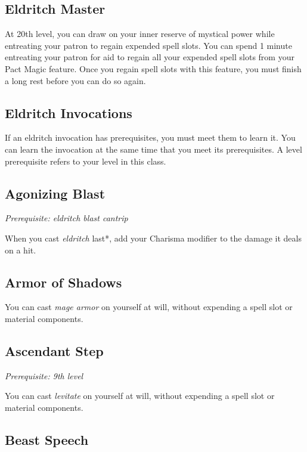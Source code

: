 \subsection{Eldritch Master}

At 20th level, you can draw on your inner reserve of mystical power while entreating your patron to regain expended spell slots. You can spend 1 minute entreating your patron for aid to regain all your expended spell slots from your Pact Magic feature. Once you regain spell slots with this feature, you must finish a long rest before you can do so again.

\subsection{Eldritch Invocations}

If an eldritch invocation has prerequisites, you must meet them to learn it. You can learn the invocation at the same time that you meet its prerequisites. A level prerequisite refers to your level in this class.

\subsection{Agonizing Blast}

\textit{Prerequisite: eldritch blast cantrip}

When you cast \textit{eldritch }last*, add your Charisma modifier to the damage it deals on a hit.

\subsection{Armor of Shadows}

You can cast \textit{mage armor} on yourself at will, without expending a spell slot or material components.

\subsection{Ascendant Step}

\textit{Prerequisite: 9th level}

You can cast \textit{levitate} on yourself at will, without expending a spell slot or material components.

\subsection{Beast Speech}

